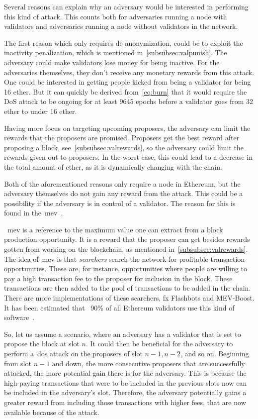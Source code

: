 Several reasons can explain why an adversary would be interested in performing this kind of attack.
This counts both for adversaries running a node with validators and adversaries running a node without validators in the network.


The first reason which only requires de-anonymization, could be to exploit the inactivity penalization,
which is mentioned in~\autoref{subsubsec:valpunish}.
The adversary could make validators lose money for being inactive.
For the adversaries themselves, they don't receive any monetary rewards from this attack.
One could be interested in getting people kicked from being a validator for being 16 ether.
But it can quickly be derived from~\autoref{eq:burn} that it would require the DoS attack
to be ongoing for at least 9645 epochs before a validator goes from 32 ether to under 16 ether.


Having more focus on targeting upcoming proposers, the adversary can limit the rewards that the proposers are promised.
Proposers get the best reward after proposing a block, see~\autoref{subsubsec:valrewards},
so the adversary could limit the rewards given out to proposers.
In the worst case, this could lead to a decrease in the total amount of ether,
as it is dynamically changing with the chain.


Both of the aforementioned reasons only require a node in Ethereum,
but the adversary themselves do not gain any reward from the attack.
This could be a possibility if the adversary is in control of a validator.
The reason for this is found in the~\gls{mev}~\cite{mev}.

~\gls{mev} is a reference to the maximum value one can extract from a block production opportunity.
It is a reward that the proposer can get besides rewards gotten from working on the blockchain,
as mentioned in~\autoref{subsubsec:valrewards}.
The idea of~\gls{mev} is that \textit{searchers} search the network for profitable transaction opportunities.
These are, for instance,
opportunities where people are willing to pay a high transaction fee to the proposer for inclusion in the block.
These transactions are then added to the pool of transactions to be added in the chain.
There are more implementations of these searchers, fx Flashbots and MEV-Boost.
It has been estimated that ~90\% of all Ethereum validators use this kind of software~\cite{cryptoeprint:2023/760}.

So, let us assume a scenario, where an adversary has a validator that is set to propose the block at slot $n$.
It could then be beneficial for the adversary to perform a~\gls{dos} attack on the proposers of slot $n-1, n-2$,
and so on.
Beginning from slot $n-1$ and down, the more consecutive proposers that are successfully attacked,
the more potential gain there is for the adversary.
This is
because the high-paying transactions
that were to be included in the previous slots now can be included in the adversary's slot.
Therefore, the adversary potentially gains a greater reward from including those transactions with higher fees,
that are now available because of the attack.

